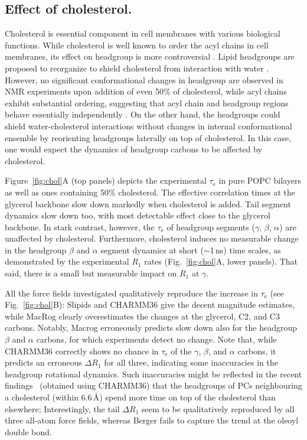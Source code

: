 \documentclass[journal=jcisd8,manuscript=article,layout=twocolumn]{achemso}
\begin{document}
\subsection*{Effect of cholesterol.}
Cholesterol is essential component in cell membranes with various biological functions.
While cholesterol is well known to order the acyl chains in cell membranes,
its effect on headgroup is more controversial \cite{huang99,ferreira13}. Lipid headgroups are proposed
to reorganize to shield cholesterol from interaction with water \cite{huang99}. However, no
significant conformational changes in headgroup are observed in NMR experiments upon addition
of even 50\% of cholesterol, while acyl chains exhibit substantial ordering,
suggesting that acyl chain and headgroup regions behave essentially independently \cite{ferreira13,botan15}.
On the other hand, the headgroups could shield water-cholesterol interactions
without changes in internal conformational ensemble by reorienting headgroups laterally on
top of cholesterol. In this case, one would expect the dynamics of headgroup carbons to be affected by cholesterol. 


Figure~\ref{fig:chol}A (top panels) depicts the experimental $\tau_\mathrm e$ in pure POPC bilayers as well as ones containing 50\% cholesterol. The effective correlation times at the glycerol backbone
slow down markedly when cholesterol is added. Tail segment dynamics slow down too, with most detectable effect close to the glycerol backbone.
%
In stark contrast, however,
the $\tau_\mathrm e$ of headgroup segments ($\gamma$, $\beta$, $\alpha$)
are unaffected by cholesterol. 
%
Furthermore, cholesterol induces no measurable change in the
headgroup $\beta$ and $\alpha$ segment
dynamics at short ($\sim$1\,ns) time scales, as
demonstrated by
the experimental $R_{1}$ rates (Fig.~\ref{fig:chol}A, lower panels).
That said,
there is a small but measurable impact on $R_1$ at $\gamma$.


All the force fields investigated qualitatively reproduce the increase in $\tau_\mathrm e$ (see Fig.~\ref{fig:chol}B):
Slipids and CHARMM36 give the decent magnitude estimates, while MacRog clearly overestimates the changes at the glycerol, C2, and C3 carbons. Notably, Macrog erroneously predicts slow down also for the headgroup $\beta$ and $\alpha$ carbons, for which experiments detect no change. 
%
Note that,  while CHARMM36 correctly shows no chance in $\tau_\mathrm{e}$
of the $\gamma$, $\beta$, and $\alpha$ carbons,
it predicts an erroneous $\Delta R_{1}$ for all three, indicating some inaccuracies in the
headgroup rotational dynamics. %
Such inaccuracies might be reflected in the recent findings~\cite{leeb18}
(obtained using CHARMM36)
that 
the headgroups of PCs neighbouring a cholesterol (within 6.6\,\AA) spend more time on top of the cholesterol than elsewhere;
%
Interestingly, 
the tail $\Delta R_{1}$ seem to be qualitatively reproduced by
all three all-atom force fields, whereas Berger fails to capture the trend at the oleoyl double bond.
\end{document}
